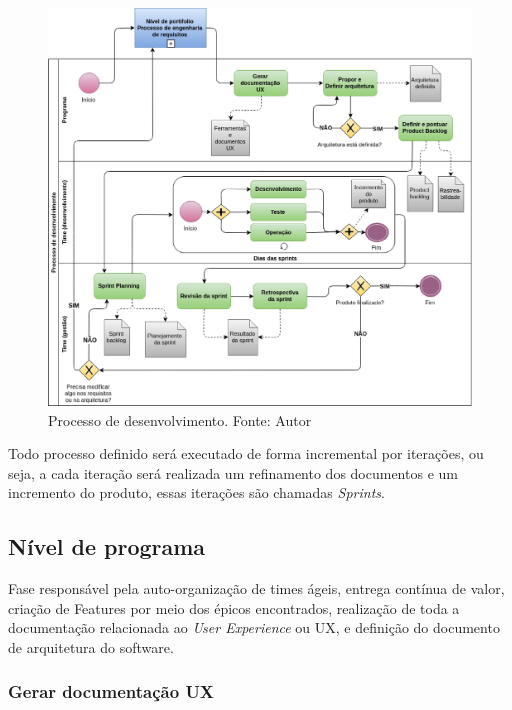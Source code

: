 \begin{figure}[h!]
	\centering
  \includegraphics[keepaspectratio=true,scale=0.5]{figuras/desenvolvimento.eps}
  \caption[Processo de desenvolvimento.]{Processo de desenvolvimento. Fonte: Autor}
	\label{fig:desenvolvimento}
\end{figure}

Todo processo definido será executado de forma incremental por iterações, ou seja, a cada iteração será realizada um
refinamento dos documentos e um incremento do produto, essas iterações são chamadas \textit{Sprints}.

\subsection{Nível de programa}

Fase responsável pela auto-organização de times ágeis, entrega contínua de valor, criação de Features por meio dos épicos encontrados, realização de toda a documentação relacionada ao \textit{User Experience} ou UX, e definição do documento de arquitetura do software.

\subsubsection{Gerar documentação UX}

